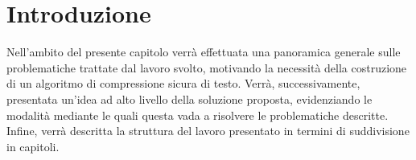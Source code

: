 \chapter{Introduzione}

\begin{citazione}
Nell'ambito del presente capitolo verrà effettuata una panoramica generale sulle problematiche trattate dal lavoro svolto, motivando la necessità della costruzione di un algoritmo di compressione sicura di testo. Verrà, successivamente, presentata un'idea ad alto livello della soluzione proposta, evidenziando le modalità mediante le quali questa vada a risolvere le problematiche descritte. Infine, verrà descritta la struttura del lavoro presentato in termini di suddivisione in capitoli. 
\end{citazione}
\newpage

